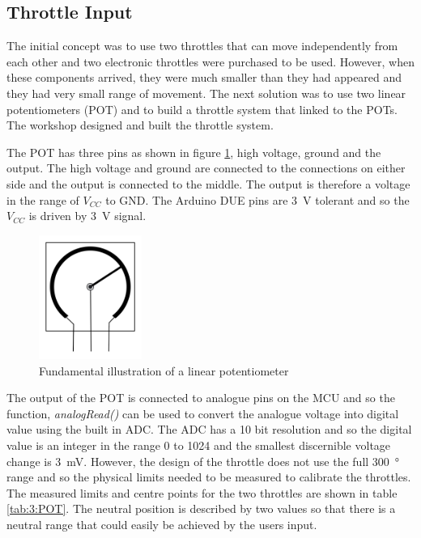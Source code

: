 \subsection{Throttle Input}
The initial concept was to use two throttles that can move independently from each other and %
two electronic throttles were 
purchased to be used. However, when these components arrived, they were much smaller than they had appeared and they had very small range of movement. The next solution was to use two linear potentiometers (POT) and to build a throttle system that linked to the POTs. The workshop designed and built the throttle system.
\par
\vspace{0.4cm}
The POT has three pins as shown in figure \ref{fig:3:POTdraw}, high voltage, ground and the output. The high voltage and ground are connected to the connections on either side and the output is connected to the middle. The output is therefore a voltage in the range of $V_{CC}$ to GND. The Arduino DUE pins are \SI{3}{\volt} tolerant and so the $V_{CC}$ is driven by \SI{3}{\volt} signal. \par
\vspace{0.4cm}
\begin{figure}[ht]
	\begin{center}
		\includegraphics[width = 0.3\textwidth]{figures/POT.jpg}
		\caption{Fundamental illustration of a linear potentiometer}
		\label{fig:3:POTdraw}
	\end{center}
\end{figure}
The output of the POT is connected to analogue pins on the MCU and so the function, \textit{analogRead()} can be used to convert the analogue voltage into digital value using the built in ADC. The ADC has a 10 bit resolution and so the digital value is an integer in the range 0 to 1024 and the smallest discernible voltage change is \SI{3}{\milli\volt}. However, the design of the throttle does not use the full \SI{300}{\degree} range and so the physical limits needed to be measured to calibrate the throttles. The measured limits and centre points for the two throttles are shown in table \ref{tab:3:POT}. The neutral position is described by two values so that there is a neutral range that could easily be achieved by the users input. \par
